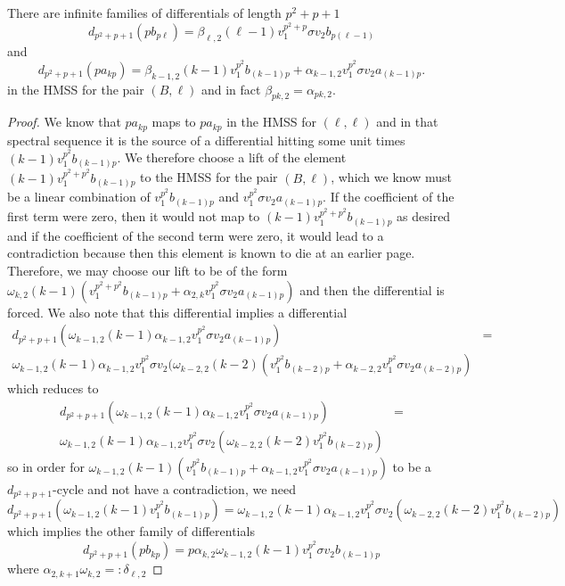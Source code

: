 \begin{lem}
There are infinite families of differentials of length $p^2+p+1$
\[ 
	d_{p^2+p+1}(pb_{p\ell})=\beta_{\ell,2}(\ell-1) v_1^{p^2+p}\sigma v_2b_{p(\ell-1)}
	\]
and 
\[
	d_{p^2+p+1}(pa_{kp}) = \beta_{k-1,2} (k-1)v_1^{p^2} b_{(k-1)p}+\alpha_{k-1,2}v_1^{p^2}\sigma v_2a_{(k-1)p}.
\]
in the HMSS for the pair $(B,\ell)$ and in fact $\beta_{pk,2}=\alpha_{pk,2}$.
\end{lem}
\begin{proof}
We know that $pa_{kp}$ maps to $pa_{kp}$ in the HMSS for $(\ell,\ell)$ and in that spectral sequence it is the source of a differential hitting some unit times 
$(k-1)v_1^{p^2} b_{(k-1)p}$. 
We therefore choose a lift of the element $(k-1)v_1^{p^2 +p^2} b_{(k-1)p}$
to the HMSS for the pair $(B,\ell)$, which we know must be a linear combination of 
$v_1^{p^2} b_{(k-1)p}$ and $v_1^{p^2}\sigma v_2a_{(k-1)p}$. 
If the coefficient of the first term were zero, then it would not map to $(k-1)v_1^{p^2 +p^2} b_{(k-1)p}$ as desired and if the coefficient of the second term were zero, it would lead to a contradiction because then this element is known to die at an earlier page. 
Therefore, we may choose our lift to be of the form $\omega_{k,2} (k-1)\left ( v_1^{p^2 +p^2} b_{(k-1)p}+\alpha_{2,k}v_1^{p^2}\sigma v_2a_{(k-1)p}\right )$ and then the differential is forced. 
We also note that this differential implies a differential 
\begin{align*}
d_{p^2+p+1}(\omega_{k-1,2} (k-1) \alpha_{k-1,2}v_1^{p^2}\sigma v_2a_{(k-1)p})& =\\
\omega_{k-1,2} (k-1) \alpha_{k-1,2}v_1^{p^2}\sigma v_2 ( \omega_{k-2,2} (k-2)\left ( v_1^{p^2} b_{(k-2)p}+\alpha_{k-2,2}v_1^{p^2}\sigma v_2a_{(k-2)p}\right )
\end{align*}
which reduces to 
\begin{align*}
d_{p^2+p+1}(\omega_{k-1,2} (k-1) \alpha_{k-1,2}v_1^{p^2}\sigma v_2a_{(k-1)p})&= \\
\omega_{k-1,2} (k-1) \alpha_{k-1,2}v_1^{p^2}\sigma v_2( \omega_{k-2,2} (k-2)v_1^{p^2} b_{(k-2)p})&
\end{align*}
so in order for $\omega_{k-1,2} (k-1)\left ( v_1^{p^2} b_{(k-1)p}+\alpha_{k-1,2}v_1^{p^2}\sigma v_2a_{(k-1)p}\right )$ to be a $d_{p^2+p+1}$-cycle and not have a contradiction, we need 
\[ d_{p^2+p+1}(\omega_{k-1,2} (k-1) v_1^{p^2 } b_{(k-1)p})= \omega_{k-1,2} (k-1) \alpha_{k-1,2}v_1^{p^2}\sigma v_2( \omega_{k-2,2} (k-2) v_1^{p^2} b_{(k-2)p})\]
which implies the other family of differentials
\[ d_{p^2+p+1}(pb_{kp})=p\alpha_{k,2}\omega_{k-1,2} (k-1)v_1^{p^2}\sigma v_2 b_{(k-1)p}\]
where $\alpha_{2,k+1}\omega_{k,2}=:\delta_{\ell,2}$
\end{proof}
